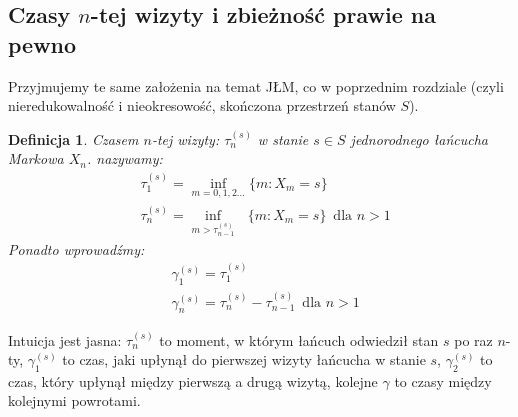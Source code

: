 \documentclass[a4paper]{article}
\theoremstyle{defn}
\newtheorem{defn}{Definicja}[subsection]
\theoremstyle{theorem}
\theoremstyle{lemma}
\theoremstyle{cor}
\theoremstyle{fact}
\begin{document}
\subsection{Czasy $n$-tej wizyty i zbieżność prawie na pewno}
\label{sect2.5}
Przyjmujemy te same założenia na temat JŁM, co w poprzednim rozdziale (czyli nieredukowalność i nieokresowość, skończona przestrzeń stanów $S$).
\begin{defn}\label{defn2.5.1}
Czasem $n$-tej wizyty:  $\tau_n^{(s)}$  w stanie $s \in S$ jednorodnego łańcucha Markowa $X_n$. nazywamy:\\
\begin{align*}
&\tau_1^{(s)} = \inf_{m = 0,1,2...} \{m: X_m = s\}\\
&\tau_n^{(s)} = \inf_{m > \tau_{n-1}^{(s)}} \,\,\,\,\{m: X_m = s\} \,\,\, \text{dla $n > 1$}
\end{align*}
Ponadto wprowadźmy:
\begin{align*}
    &\gamma_1^{(s)} = \tau_1^{(s)}\\
    &\gamma_n^{(s)} = \tau_n^{(s)} - \tau_{n-1}^{(s)}\,\,\,\text{dla $n > 1$}
\end{align*}
\end{defn}
Intuicja jest jasna: $\tau_n^{(s)}$ to moment, w którym łańcuch odwiedził stan $s$ po raz $n$-ty, $\gamma_1^{(s)}$ to czas, jaki upłynął do pierwszej wizyty łańcucha w stanie $s$, $\gamma_2^{(s)}$ to czas, który upłynął między pierwszą a drugą wizytą, kolejne $\gamma$ to czasy między kolejnymi powrotami.\\
\end{document}
